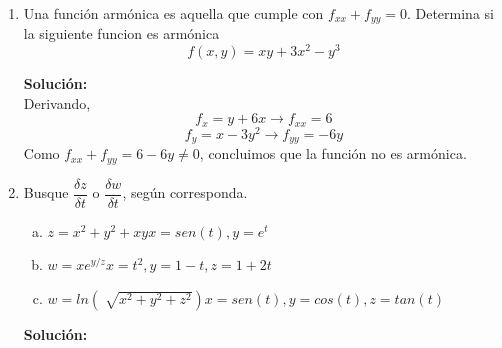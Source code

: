 \documentclass[12pt]{article}
\newenvironment{solucion}
{\begin{mdframed}[backgroundcolor=black!10]
		{\bf Solución:}\\
	}
	{
	\end{mdframed}
}
\newenvironment{preguntas}
{\begin{enumerate}\itemsep12pt
	}
	{
	\end{enumerate}
}
\newcommand{\ra}{\rightarrow}
\begin{document}
\begin{preguntas}
\begin{solucion}
\begin{enumerate}[a)]
\item $f(x,y) = \dfrac{xy}{x-y}$\\
			\\
			$$f_x = \dfrac{y(x-y)-xy}{(x-y)^2} = -\dfrac{y^2}{(x-y)^2}$$
			$$f_y = \dfrac{x(x-y)+xy}{(x-y)^2} = \dfrac{x^2}{(x-y)^2}$$
\item $f(x,y) = (x^2+y^2)sen\left(\dfrac{1}{x^2+y^2}\right)$
			$$f_x = 2x\ sen\left(\dfrac{1}{x^2+y^2}\right) + cos\left(\dfrac{1}{x^2+y^2}\right) \cdot \dfrac{-1}{(x^2+y^2)^2} \cdot 2x \cdot (x^2+y^2)$$
			$$ = 2x\ sen\left(\dfrac{1}{x^2+y^2}\right) - cos\left(\dfrac{1}{x^2+y^2}\right) \cdot \dfrac{2x}{x^2+y^2}$$
			$$f_y = 2x\ sen\left(\dfrac{1}{x^2+y^2}\right) + cos\left(\dfrac{1}{x^2+y^2}\right) \cdot \dfrac{-1}{(x^2+y^2)^2} \cdot 2y \cdot (x^2+y^2)$$
			$$ = 2x\ sen\left(\dfrac{1}{x^2+y^2}\right) - cos\left(\dfrac{1}{x^2+y^2}\right) \cdot \dfrac{2y}{x^2+y^2}$$
			Notemos que ambas derivadas son practicamente iguales, pero se cambiando de lugar las variables. Esto es porque la función cumple que $f(x,y) = f(y,x)$
\end{enumerate}
\end{solucion}
\item Una función armónica es aquella que cumple con $f_{xx} + f_{yy} = 0$. Determina si la siguiente funcion es armónica
	$$f(x,y) = xy + 3x^2 -y^3$$
\begin{solucion}
Derivando,
		$$f_x = y + 6x \ra f_{xx} = 6$$
		$$f_y = x -3y^2 \ra f_{yy} = -6y$$
		Como $f_{xx} + f_{yy} = 6 - 6y \neq 0$, concluimos que la función no es armónica.
\end{solucion}
\item Busque $\dfrac{\delta z}{\delta t}$ o $\dfrac{\delta w}{\delta t}$, según corresponda.
\begin{enumerate}[a)]
\item $z = x^2+y^2+xy$\tab$x=sen(t), y=e^t$
\item $w=xe^{y/z}$\tab$x=t^2, y=1-t, z=1+2t$
\item $w=ln(\sqrt[]{x^2+y^2+z^2})$\tab$x=sen(t), y=cos(t), z=tan(t)$
\end{enumerate}
\begin{solucion}


\end{solucion}
\end{preguntas}
\end{document}
